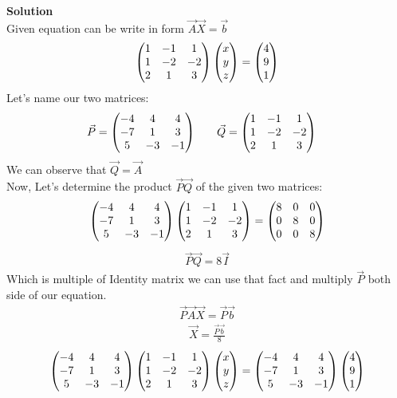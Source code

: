 \documentclass[12pt]{article}
\begin{document}
\textbf{Solution }
\\
Given equation can be write in form $\Vec{A}\Vec{X}=\Vec{b}$
\begin{align}
    \begin{pmatrix}1 & -1 & 1\\
       1 & -2 & -2\\
       2 & 1 & 3\end{pmatrix}\begin{pmatrix}x \\ y \\z\end{pmatrix}=\begin{pmatrix}4\\9\\1\end{pmatrix}
\end{align}
Let's name our two matrices:
\begin{align}
    \Vec{P} &= \begin{pmatrix}
        -4 & 4 & 4 \\
        -7 & 1 & 3 \\
        5 & -3 & -1
    \end{pmatrix} 
    \quad &
    \Vec{Q} &= \begin{pmatrix}
        1 & -1 & 1 \\
        1 & -2 & -2 \\
        2 & 1 & 3
    \end{pmatrix}
\end{align}
We can observe that $\Vec{Q}=\Vec{A}$
\\
Now, Let's determine the product $\Vec{P}\Vec{Q}$ of the given two matrices:
\begin{align}
    \begin{pmatrix}-4 & 4 & 4 \\
-7 & 1 & 3 \\
5 & -3 & -1\end{pmatrix}\begin{pmatrix}1 & -1 & 1\\
       1 & -2 & -2\\
       2 & 1 & 3\end{pmatrix}=\begin{pmatrix}
8 & 0 & 0 \\
0 & 8 & 0 \\
0 & 0 & 8
\end{pmatrix}
\end{align}
\begin{align}
    \Vec{P}\Vec{Q}=8\Vec{I}
\end{align}
Which is multiple of Identity matrix we can use that fact and multiply $\Vec{P}$ both side of our equation.
\begin{align}
    \Vec{P}\Vec{A}\Vec{X}=\Vec{P}\Vec{b}
\end{align}
\begin{align}
    \Vec{X}=\frac{\Vec{P}\Vec{b}}{8}
\end{align}
\begin{align}
    \begin{pmatrix}-4 & 4 & 4 \\
-7 & 1 & 3 \\
5 & -3 & -1\end{pmatrix} \begin{pmatrix}1 & -1 & 1\\
       1 & -2 & -2\\
       2 & 1 & 3\end{pmatrix}\begin{pmatrix}x \\ y \\z\end{pmatrix}=\begin{pmatrix}-4 & 4 & 4 \\
-7 & 1 & 3 \\
5 & -3 & -1\end{pmatrix}\begin{pmatrix}4\\9\\1\end{pmatrix}
\end{align}
\end{document}
